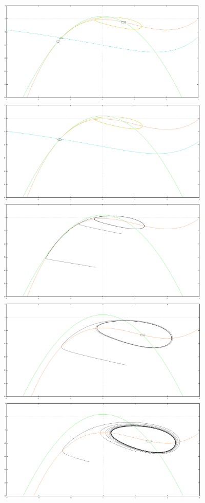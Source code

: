 \documentclass[xcolor={dvipsnames},10pt]{beamer}
\begin{document}
\begin{frame}
 {\includegraphics[height=5cm]{I_010}}
  {\includegraphics[height=5cm]{I_011}}
   {\includegraphics[height=5cm]{I_012}}
    {\includegraphics[height=5cm]{I_013}}
     {\includegraphics[height=5cm]{I_014}}

\end{frame}
\end{document}
